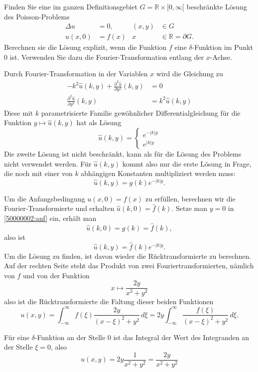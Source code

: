 Finden Sie eine im ganzen Definitionsgebiet 
$G=\mathbb R\times [0,\infty[$
beschränkte Lösung
des Poisson-Problems
\begin{align*}
\Delta u&=0,&(x,y)&\in G
\\
u(x,0)&=f(x)&x&\in\mathbb R=\partial G.
\end{align*}
Berechnen sie die Lösung explizit, wenn die Funktion $f$ eine
$\delta$-Funktion im Punkt $0$ ist. Verwenden Sie dazu die 
Fourier-Transformation entlang der $x$-Achse.

\begin{loesung}
Durch Fourier-Transformation in der Variablen $x$ wird die Gleichung
zu
\begin{align*}
-k^2\hat u(k,y)+\frac{\partial^2\hat u}{\partial y^2}(k,y)&=0\\
\frac{\partial^2\hat u}{\partial y^2}(k,y)&= k^2\hat u(k,y)
\end{align*}
Diese mit $k$ parametrisierte Familie gewöhnlicher Differentialgleichung
für die Funktion
$y\mapsto \hat u(k,y)$ hat als Lösung
\[
\hat u(k,y)=\begin{cases}
e^{-|k|y}\\
e^{|k|y}
\end{cases}
\]
Die zweite Lösung ist nicht beschränkt, kann als für die Lösung
des Problems nicht verwendet werden. Für $\hat u(k,y)$ kommt also
nur die erste Lösung in Frage, die noch mit einer von $k$ abhängigen
Konstanten multipliziert werden muss:
\begin{equation}
\hat u(k,y)=g(k)e^{-|k|y}.
\label{50000002:anf}
\end{equation}

Um die Anfangsbedingung $u(x,0)=f(x)$ zu erfüllen, berechnen wir
die Fourier-Transformierte und erhalten $\hat u(k,0)=\hat f(k)$.
Setze man $y=0$ in \eqref{50000002:anf} ein, erhält man
\[
\hat u(k,0)=g(k)=\hat f(k),
\]
also ist 
\[
\hat u(k,y)=\hat f(k)e^{-|k|y}.
\]
Um die Lösung zu finden, ist davon wieder die Rücktransformierte
zu berechnen. Auf der rechten Seite steht das Produkt von zwei
Fouriertransformierten, nämlich von $f$ und von der Funktion
\[
x\mapsto \frac{2y}{x^2+y^2}
\]
also ist die Rücktransformierte die Faltung dieser beiden
Funktionen
\[
u(x,y)=\int_{-\infty}^\infty 
f(\xi) 
\frac{2y}{(x-\xi)^2+y^2}
\,d\xi
=
2y\int_{-\infty}^\infty\frac{f(\xi)}{(x-\xi)^2+y^2}\,d\xi.
\]

Für eine $\delta$-Funktion an der Stelle $0$ ist das Integral der
Wert des Integranden an der Stelle $\xi=0$, also
\[
u(x,y)=2y\frac{1}{x^2+y^2}=\frac{2y}{x^2+y^2}
\]


\end{loesung}
